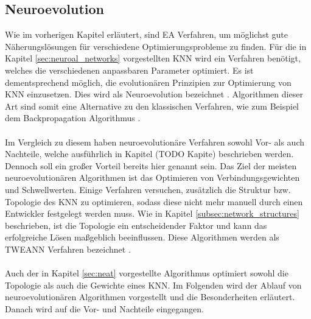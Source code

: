 \subsection{Neuroevolution}
Wie im vorherigen Kapitel erläutert, sind \ac{EA} Verfahren, um möglichst gute Näherungslösungen für verschiedene Optimierungsprobleme zu finden. Für die in Kapitel \ref{sec:neuroal_networks} vorgestellten \ac{KNN} wird ein Verfahren benötigt, welches die verschiedenen anpassbaren Parameter optimiert. Es ist dementsprechend möglich, die evolutionären Prinzipien zur Optimierung von \ac{KNN} einzusetzen. Dies wird als Neuroevolution bezeichnet \cite{meisner2009neurostrategies}. Algorithmen dieser Art sind somit eine Alternative zu den klassischen Verfahren, wie zum Beispiel dem Backpropagation Algorithmus \cite{whitley1993genetic}. 
\\\\
Im Vergleich zu diesem haben neuroevolutionäre Verfahren sowohl Vor- als auch Nachteile, welche ausführlich in Kapitel (TODO Kapite) beschrieben werden. Dennoch soll ein großer Vorteil bereits hier genannt sein. Das Ziel der meisten neuroevolutionären Algorithmen ist das Optimieren von Verbindungsgewichten und Schwellwerten. Einige Verfahren versuchen, zusätzlich die Struktur bzw. Topologie des \ac{KNN} zu optimieren, sodass diese nicht mehr manuell durch einen Entwickler festgelegt werden muss. Wie in Kapitel \ref{subsec:network_structures} beschrieben, ist die Topologie ein entscheidender Faktor und kann das erfolgreiche Lösen maßgeblich beeinflussen. Diese Algorithmen werden als \ac{TWEANN} Verfahren bezeichnet \cite{stanley2002evolving}. 
\\\\
Auch der in Kapitel \ref{sec:neat} vorgestellte Algorithmus optimiert sowohl die Topologie als auch die Gewichte eines \ac{KNN}. Im Folgenden wird der Ablauf von neuroevolutionären Algorithmen vorgestellt und die Besonderheiten erläutert. Danach wird auf die Vor- und Nachteile eingegangen.

